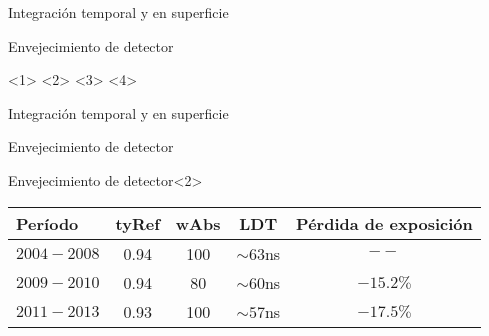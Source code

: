 \begin{frame}{Integraci\'on temporal y en superficie}
	\begin{block}{Envejecimiento de detector}
		\begin{center}
		<1>
		<2>
		<3>
		<4>
		\end{center}
	\end{block}
\end{frame}


\begin{frame}{Integraci\'on temporal y en superficie}
	\begin{block}{Envejecimiento de detector}
		\begin{center}
		\end{center}
	\end{block}
	\begin{block}{Envejecimiento de detector}<2>
		\begin{center}
		\renewcommand{\arraystretch}{1.4}
		\footnotesize
		\begin{tabular}{|l|ccc|c|}
					\hline
					Período       & tyRef & wAbs & LDT        &    Pérdida de exposición \\
					\hline
					$2004 - 2008$ & 0.94  & 100  & $\sim63$ns &    $--$ \\
					$2009 - 2010$ & 0.94  & 80   & $\sim60$ns &    $-15.2\%$\\
					$2011 - 2013$ & 0.93  & 100  & $\sim57$ns &    $-17.5\%$\\
					\hline
		\end{tabular}
		\end{center}
	\end{block}
\end{frame}

